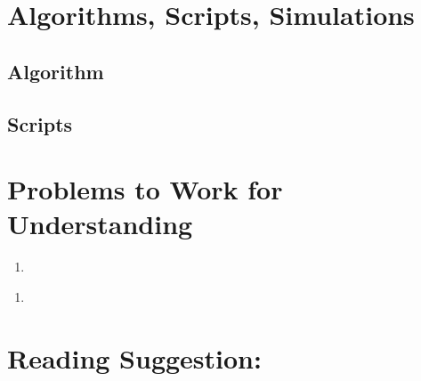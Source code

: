 \documentclass[12pt]{article}
\begin{document}
\nocite{}
\nocite{}

\hr

\section*{Algorithms, Scripts, Simulations}

\subsection*{Algorithm}

\subsection*{Scripts}



\hr

\section*{Problems to Work for Understanding}
\renewcommand{\theexerciseseries}{}
\renewcommand{\theexercise}{\arabic{exercise}}

\begin{exercise}
  
\end{exercise}
\begin{solution}
  
\end{solution}
\begin{exercise}
  \begin{enumerate}[label=(\alpha*)]
  \item 
  \end{enumerate}
\end{exercise}
\begin{solution}
  \begin{enumerate}[label=(\alpha*)]
  \item 
  \end{enumerate}
\end{solution}

\hr

\section*{Reading Suggestion:}
\end{document}
